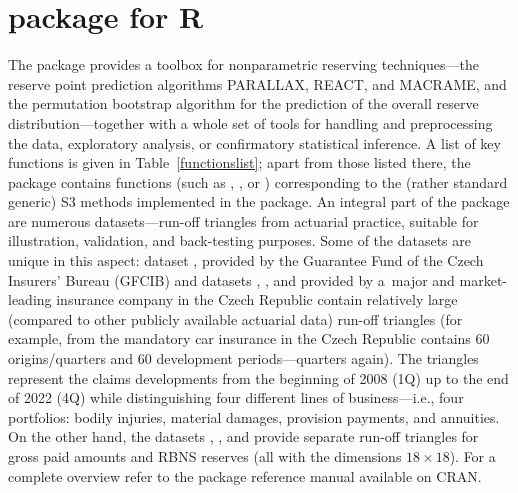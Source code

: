 \section{\texorpdfstring{ package for R}{Package for R}}
\label{Rpackage}
The package provides a toolbox for nonparametric reserving techniques---the reserve point prediction algorithms PARALLAX, REACT, and MACRAME, and the permutation bootstrap algorithm for the prediction of the overall reserve distribution---together with a whole set of tools for handling and preprocessing the data, exploratory analysis, or confirmatory statistical inference. 
A list of key functions is given in Table~\ref{functionslist}; apart from those listed there, the package contains functions (such as , , or ) corresponding to the (rather standard generic) S3 methods implemented in the package. An integral part of the package are numerous datasets---run-off triangles from actuarial practice, suitable for illustration, validation, and back-testing purposes. 
Some of the datasets are unique in this aspect: dataset , provided by the Guarantee Fund of the Czech Insurers’ Bureau (GFCIB) and datasets , , and  provided by a~major and market-leading insurance company in the Czech Republic contain relatively large (compared to other publicly available actuarial data) run-off triangles (for example,  from the mandatory car insurance in the Czech Republic contains $60$ origins/quarters and $60$ development periods---quarters again). 
The triangles represent the claims developments from the beginning of 2008 (1Q) up to the end of 2022 (4Q) while distinguishing four different lines of business---i.e., four portfolios: bodily injuries, material damages, provision payments, and annuities. On the other hand, the datasets , , and  
provide separate run-off triangles for gross paid amounts and RBNS reserves (all with the dimensions $18 \times 18$).
For a complete overview refer to the package 
reference manual available on CRAN.

